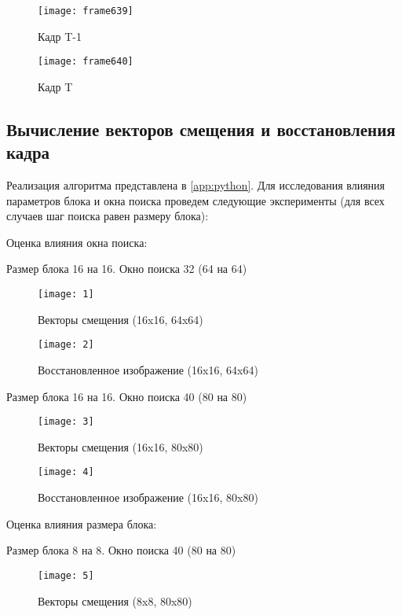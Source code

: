 \begin{figure}[H]
	\centering
	\texttt{[image: frame639]}
	\caption{Кадр T-1}
	\label{pic:frame639}
\end{figure}

\begin{figure}[H]
	\centering
	\texttt{[image: frame640]}
	\caption{Кадр T}
	\label{pic:frame640}
\end{figure}

\subsection{Вычисление векторов смещения и восстановления кадра}

Реализация алгоритма представлена в \vref{app:python}. Для исследования влияния параметров блока и окна поиска проведем следующие эксперименты (для всех случаев шаг поиска равен размеру блока):

Оценка влияния окна поиска:

Размер блока 16 на 16. Окно поиска 32 (64 на 64) 

\begin{figure}[H]
	\centering
	\texttt{[image: 1]}
	\caption{Векторы смещения (16x16, 64x64)}
	\label{pic:1}
\end{figure}

\begin{figure}[H]
	\centering
	\texttt{[image: 2]}
	\caption{Восстановленное изображение (16x16, 64x64)}
	\label{pic:2}
\end{figure}

Размер блока 16 на 16. Окно поиска 40 (80 на 80) 

\begin{figure}[H]
	\centering
	\texttt{[image: 3]}
	\caption{Векторы смещения (16x16, 80x80)}
	\label{pic:3}
\end{figure}

\begin{figure}[H]
	\centering
	\texttt{[image: 4]}
	\caption{Восстановленное изображение (16x16, 80x80)}
	\label{pic:4}
\end{figure}

Оценка влияния размера блока: 

Размер блока 8 на 8. Окно поиска 40 (80 на 80)

\begin{figure}[H]
	\centering
	\texttt{[image: 5]}
	\caption{Векторы смещения (8x8, 80x80)}
	\label{pic:5}
\end{figure}

